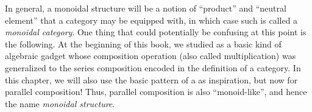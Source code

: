 
In general, a monoidal structure will be a notion of ``product'' and ``neutral element'' that a category may be equipped with, in which case such is called a \emph{monoidal category}.
One thing that could potentially be confusing at this point is the following.
At the beginning of this book, we studied  as a basic kind of algebraic gadget whose composition operation (also called multiplication) was generalized to the series composition encoded in the definition of a category.
In this chapter, we will also use the basic pattern of a  as inspiration, but now for parallel composition!
Thus, parallel composition is also ``monoid-like'', and hence the name \emph{monoidal structure}.
